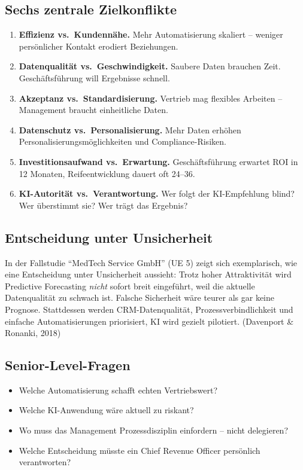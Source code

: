 \documentclass[11pt,a4paper,oneside]{article}
\newcommand{\quelle}[1]{{\footnotesize\color{lpGray}(#1)}}
\begin{document}
\subsection{Sechs zentrale Zielkonflikte}

\begin{enumerate}
  \item \textbf{Effizienz vs.\ Kundennähe.} Mehr Automatisierung skaliert -- weniger persönlicher Kontakt erodiert Beziehungen.
  \item \textbf{Datenqualität vs.\ Geschwindigkeit.} Saubere Daten brauchen Zeit. Geschäftsführung will Ergebnisse schnell.
  \item \textbf{Akzeptanz vs.\ Standardisierung.} Vertrieb mag flexibles Arbeiten -- Management braucht einheitliche Daten.
  \item \textbf{Datenschutz vs.\ Personalisierung.} Mehr Daten erhöhen Personalisierungsmöglichkeiten und Compliance-Risiken.
  \item \textbf{Investitionsaufwand vs.\ Erwartung.} Geschäftsführung erwartet ROI in 12 Monaten, Reifeentwicklung dauert oft 24--36.
  \item \textbf{KI-Autorität vs.\ Verantwortung.} Wer folgt der KI-Empfehlung blind? Wer überstimmt sie? Wer trägt das Ergebnis?
\end{enumerate}

\subsection{Entscheidung unter Unsicherheit}

In der Fallstudie ``MedTech Service GmbH'' (UE 5) zeigt sich exemplarisch, wie eine Entscheidung unter Unsicherheit aussieht: Trotz hoher Attraktivität wird Predictive Forecasting \emph{nicht} sofort breit eingeführt, weil die aktuelle Datenqualität zu schwach ist. Falsche Sicherheit wäre teurer als gar keine Prognose. Stattdessen werden CRM-Datenqualität, Prozessverbindlichkeit und einfache Automatisierungen priorisiert, KI wird gezielt pilotiert. \quelle{Davenport \& Ronanki, 2018}

\subsection{Senior-Level-Fragen}

\begin{itemize}
  \item Welche Automatisierung schafft echten Vertriebswert?
  \item Welche KI-Anwendung wäre aktuell zu riskant?
  \item Wo muss das Management Prozessdisziplin einfordern -- nicht delegieren?
  \item Welche Entscheidung müsste ein Chief Revenue Officer persönlich verantworten?
\end{itemize}
\end{document}
